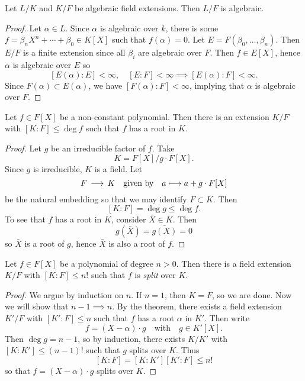 \begin{thm}
	Let $L/K$ and $K/F$ be algebraic field extensions. Then $L/F$ is algebraic.\sidenote{\[
		\begin{psmatrix}[rowsep=0.5cm, colsep=1cm, linewidth=1pt]
			L\\
			K\\
			F
			\psset{arrows=-, nodesep=3pt}
			\everypsbox{\scriptstyle}
			\ncline{1,1}{2,1}
			\ncline{2,1}{3,1}
		\end{psmatrix}
	\]}
\end{thm}
\begin{proof}
	Let $\alpha \in L$. Since $\alpha$ is algebraic over $k$, there is some $f = \beta_n X^n + \cdots + \beta_0 \in K[X]$ such that $f(\alpha) = 0$. Let $E = F(\beta_0,\ldots,\beta_n)$. Then $E/F$ is a finite extension since all $\beta_i$ are algebraic over $F$. Then $f \in E[X]$, hence $\alpha$ is algebraic over $E$ so
	\[
		[E(\alpha) : E] < \infty, \quad [E:F] < \infty \implies [E(\alpha):F] < \infty.
	\]
	Since $F(\alpha) \subset E(\alpha)$, we have $[F(\alpha) : F] < \infty$, implying that $\alpha$ is algebraic over $F$.
\end{proof}

\begin{thm}
	Let $f \in F[X]$ be a non-constant polynomial. Then there is an extension $K/F$ with $[K:F]\leq \deg f$ such that $f$ has a root in $K$.
\end{thm}
\begin{proof}
	Let $g$ be an irreducible factor of $f$. Take
	\[
		K = F[X] / g\cdot F[X].
	\]
	Since $g$ is irreducible, $K$ is a field. Let
	\[
		F \,\longrightarrow\, K \quad \text{given by} \quad a \longmapsto a + g\cdot F[X]
	\]
	be the natural embedding so that we may identify $F \subset K$. Then
	\[
		[K : F] = \deg g \leq \deg f.
	\]
	To see that $f$ has a root in $K$, consider $\bar X \in K$. Then
	\[
		g(\bar X) = \bar{g(X)} = 0
	\]
	so $\bar X$ is a root of $g$, hence $\bar X$ is also a root of $f$.
\end{proof}

\begin{cor}
	Let $f \in F[X]$ be a polynomial of degree $n>0$. Then there is a field extension $K/F$ with $[K : F] \leq n!$ such that $f$ is \emph{split} over $K$.
\end{cor}
\begin{proof}
	We argue by induction on $n$. If $n = 1$, then $K =F$, so we are done. Now we will show that $n-1 \implies n$. By the theorem, there exists a field extension $K' / F$ with $[K' : F] \leq n$ such that $f$ has a root $\alpha$ in $K'$. Then write
	\[
		f = (X - \alpha)\cdot g \quad \text{with} \quad g \in K'[X].
	\]
	Then $\deg g = n - 1$, so by induction, there exists $K/K'$ with $[K : K'] \leq (n-1)!$ such that $g$ splits over $K$. Thus
	\[
		[K:F] = [K:K'][K':F] \leq n!
	\]
	so that $f = (X - \alpha)\cdot g$ splits over $K$.
\end{proof}

